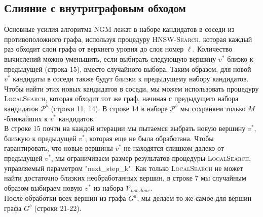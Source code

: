 \documentclass{article}
\begin{document}
\subsection{Слияние с внутриграфовым обходом}
Основные усилия алгоритма \textsc{NGM} лежат в наборе кандидатов в соседи из противоположного графа, используя процедуру \textsc{HNSW-Search}, которая каждый раз обходит слои графа от верхнего уровня до слоя номер $\ell$. Количество вычислений можно уменьшить, если выбирать следующую вершину $v^*$ близко к предыдущей (строка 15), вместо случайного выбора. Таким образом, для новой $v^*$ кандидаты в соседи также будут близки к предыдущему набору кандидатов. Чтобы найти этих новых кандидатов в соседи, мы можем использовать процедуру \textsc{LocalSearch}, которая обходит тот же граф, начиная с предыдущего набора кандидатов $\mathcal{P}^b$ (строки 11, 14). В строке 14 в наборе $\mathcal{P}^b$ мы сохраняем только $M$-ближайших к $v^*$ кандидатов.\\
В строке 15 почти на каждой итерации мы пытаемся выбрать новую вершину $v^*$, близкую к предыдущей $v^*$, которая еще не была обработана.
Чтобы гарантировать, что новые вершины $v^*$ не находятся слишком далеко от предыдущей $v^*$, мы ограничиваем размер результатов процедуры \textsc{LocalSearch}, управляемый параметром "next\_step\_k". Как только \textsc{LocalSearch} не может найти достаточно близких необработанных вершин, в строке 7 мы случайным образом выбираем новую $v^*$ из набора $\mathcal{V}_{not\_done}$. \\
После обработки всех вершин из графа $G^a$, мы делаем то же самое для вершин графа $G^b$ (строки 21-22).
\end{document}
